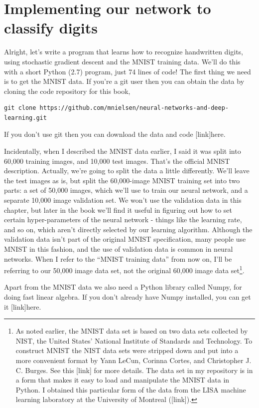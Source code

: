\documentclass[a4paper,twoside,10pt]{book}
\begin{document}
\section{Implementing our network to classify digits}
Alright, let's write a program that learns how to recognize handwritten digits, using stochastic gradient descent and the MNIST training data. We'll do this with a short Python (2.7) program, just 74 lines of code! The first thing we need is to get the MNIST data. If you're a git user then you can obtain the data by cloning the code repository for this book,

\begin{lstlisting}
git clone https://github.com/mnielsen/neural-networks-and-deep-learning.git
\end{lstlisting}
If you don't use git then you can download the data and code [link]here.

Incidentally, when I described the MNIST data earlier, I said it was split into 60,000 training images, and 10,000 test images. That's the official MNIST description. Actually, we're going to split the data a little differently. We'll leave the test images as is, but split the 60,000-image MNIST training set into two parts: a set of 50,000 images, which we'll use to train our neural network, and a separate 10,000 image validation set. We won't use the validation data in this chapter, but later in the book we'll find it useful in figuring out how to set certain hyper-parameters of the neural network - things like the learning rate, and so on, which aren't directly selected by our learning algorithm. Although the validation data isn't part of the original MNIST specification, many people use MNIST in this fashion, and the use of validation data is common in neural networks. When I refer to the ``MNIST training data'' from now on, I'll be referring to our 50,000 image data set, not the original 60,000 image data set\footnote{As noted earlier, the MNIST data set is based on two data sets collected by NIST, the United States' National Institute of Standards and Technology. To construct MNIST the NIST data sets were stripped down and put into a more convenient format by Yann LeCun, Corinna Cortes, and Christopher J. C. Burges. See this [link] for more details. The data set in my repository is in a form that makes it easy to load and manipulate the MNIST data in Python. I obtained this particular form of the data from the LISA machine learning laboratory at the University of Montreal ([link]).}.

Apart from the MNIST data we also need a Python library called Numpy, for doing fast linear algebra. If you don't already have Numpy installed, you can get it [link]here.
\end{document}
